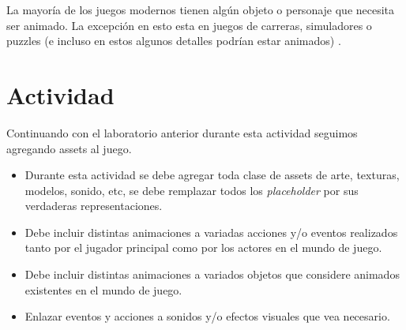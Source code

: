 La mayoría de los juegos modernos tienen algún objeto o personaje que necesita ser animado. La excepción en esto esta en juegos de carreras, simuladores o puzzles (e incluso en estos algunos detalles podrían estar animados) \cite[p.~381]{erikgamedevelopment}.
\section{Actividad}
Continuando con el laboratorio anterior durante esta actividad seguimos agregando assets al juego.
\begin{itemize}
\item Durante esta actividad se debe agregar toda clase de assets de arte, texturas, modelos, sonido, etc, se debe remplazar todos los \emph{placeholder} por sus verdaderas representaciones.
\item Debe incluir distintas animaciones a variadas acciones y/o eventos realizados tanto por el jugador principal como por los actores en el mundo de juego.
\item Debe incluir distintas animaciones a variados objetos que considere animados existentes en el mundo de juego.
\item Enlazar eventos y acciones a sonidos y/o efectos visuales que vea necesario.
\end{itemize}

